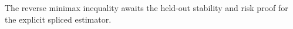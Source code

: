 The reverse minimax inequality awaits the held-out stability and risk proof for the explicit spliced estimator.